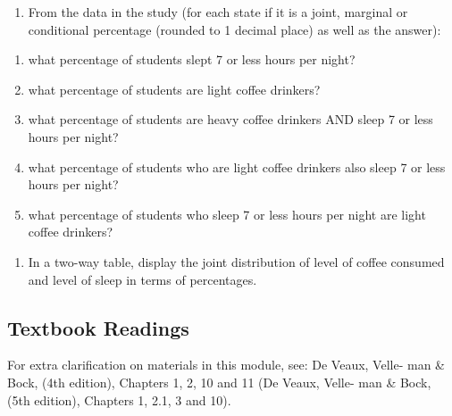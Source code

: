 \documentclass[
]{book}
\providecommand{\tightlist}{%
  \setlength{\itemsep}{0pt}\setlength{\parskip}{0pt}}
\begin{document}
\begin{enumerate}
\def\labelenumi{(\alph{enumi})}
\setcounter{enumi}{1}
\tightlist
\item
  From the data in the study (for each state if it is a joint, marginal or conditional
  percentage (rounded to 1 decimal place) as well as the answer):
\end{enumerate}

\begin{enumerate}
\def\labelenumi{\roman{enumi}.}
\tightlist
\item
  what percentage of students slept 7 or less hours per night?
\item
  what percentage of students are light coffee drinkers?
\item
  what percentage of students are heavy coffee drinkers AND sleep 7 or
  less hours per night?
\item
  what percentage of students who are light coffee drinkers also sleep 7 or
  less hours per night?
\item
  what percentage of students who sleep 7 or less hours per night are light
  coffee drinkers?
\end{enumerate}

\begin{enumerate}
\def\labelenumi{(\alph{enumi})}
\setcounter{enumi}{2}
\tightlist
\item
  In a two-way table, display the joint distribution of level of coffee consumed
  and level of sleep in terms of percentages.
\end{enumerate}

\subsection{Textbook Readings}\label{textbook-readings}

For extra clarification on materials in this module, see: De Veaux, Velle-
man \& Bock, (4th edition), Chapters 1, 2, 10 and 11 (De Veaux, Velle-
man \& Bock, (5th edition), Chapters 1, 2.1, 3 and 10).


\end{document}
